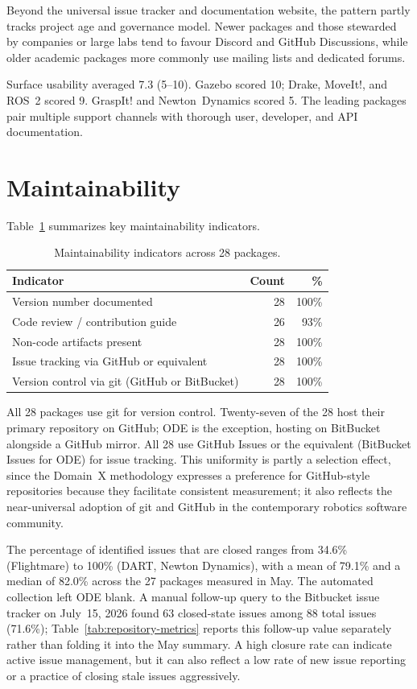 Beyond the universal issue tracker and documentation website, the pattern partly tracks project age and governance model. Newer packages and those stewarded by companies or large labs tend to favour Discord and GitHub Discussions, while older academic packages more commonly use mailing lists and dedicated forums.

Surface usability averaged 7.3 (5--10). Gazebo scored 10; Drake, MoveIt!, and ROS~2 scored 9. GraspIt! and Newton~Dynamics scored 5. The leading packages pair multiple support channels with thorough user, developer, and API documentation.

\section{Maintainability}
\label{sec:maintainability-results}

Table~\ref{tab:maintainability-summary} summarizes key maintainability indicators.

\begin{table}[H]
\centering
\caption{Maintainability indicators across 28 packages.}
\label{tab:maintainability-summary}
\begin{tabular}{@{}lrr@{}}
\toprule
\textbf{Indicator} & \textbf{Count} & \textbf{\%} \\
\midrule
Version number documented & 28 & 100\% \\
Code review / contribution guide & 26 & 93\% \\
Non-code artifacts present & 28 & 100\% \\
Issue tracking via GitHub or equivalent & 28 & 100\% \\
Version control via git (GitHub or BitBucket) & 28 & 100\% \\
\bottomrule
\end{tabular}
\end{table}

All 28 packages use git for version control. Twenty-seven of the 28 host their primary repository on GitHub; ODE is the exception, hosting on BitBucket alongside a GitHub mirror. All 28 use GitHub Issues or the equivalent (BitBucket Issues for ODE) for issue tracking. This uniformity is partly a selection effect, since the Domain~X methodology expresses a preference for GitHub-style repositories because they facilitate consistent measurement; it also reflects the near-universal adoption of git and GitHub in the contemporary robotics software community.

The percentage of identified issues that are closed ranges from 34.6\% (Flightmare) to 100\% (DART, Newton Dynamics), with a mean of 79.1\% and a median of 82.0\% across the 27 packages measured in May. The automated collection left ODE blank. A manual follow-up query to the Bitbucket issue tracker on July~15, 2026 found 63 closed-state issues among 88 total issues (71.6\%); Table~\ref{tab:repository-metrics} reports this follow-up value separately rather than folding it into the May summary. A high closure rate can indicate active issue management, but it can also reflect a low rate of new issue reporting or a practice of closing stale issues aggressively.

